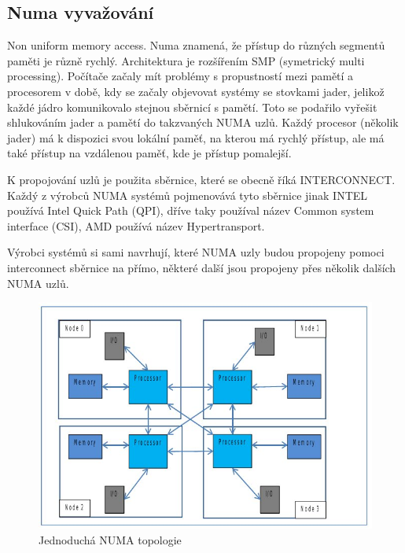 \documentclass[
  master=true,
  font=sans,
  printversion=false,
  joinlists=true,
  figures=true,
  tables=true,
  sourcecodes=false,
  theorems=false,
  bibencoding=utf8,
  language=czech,
  encoding=utf8,
  field=ainfk,
  biblatex,
  glossaries,
  index
]{kidiplom}
\begin{document}
\newpage
\subsection{Numa vyvažování}

Non uniform memory access. Numa znamená, že přístup do různých segmentů paměti je různě rychlý. Architektura je rozšířením SMP (symetrický multi processing). Počítače začaly mít problémy s propustností mezi pamětí a procesorem v době, kdy se začaly objevovat systémy se stovkami jader, jelikož každé jádro komunikovalo stejnou sběrnicí s pamětí. Toto se podařilo vyřešit shlukováním jader a pamětí do takzvaných NUMA uzlů. Každý procesor (několik jader) má k dispozici svou lokální paměť, na kterou má rychlý přístup, ale má také přístup na vzdálenou paměť, kde je přístup pomalejší.

K propojování uzlů je použita sběrnice, které se obecně říká INTERCONNECT. Každý z výrobců NUMA systémů pojmenovává tyto sběrnice jinak INTEL používá Intel Quick Path (QPI), dříve taky používal název Common system interface (CSI), AMD používá název Hypertransport.

Výrobci systémů si sami navrhují, které NUMA uzly budou propojeny pomoci interconnect sběrnice na přímo, některé další jsou propojeny přes několik dalších NUMA uzlů. 


\begin{figure}[ht]
\includegraphics[scale=0.78]{obrazky/numa-scheme.jpeg}
\caption{Jednoduchá NUMA topologie}
\label{numa scheme1}
\end{figure}
\end{document}
